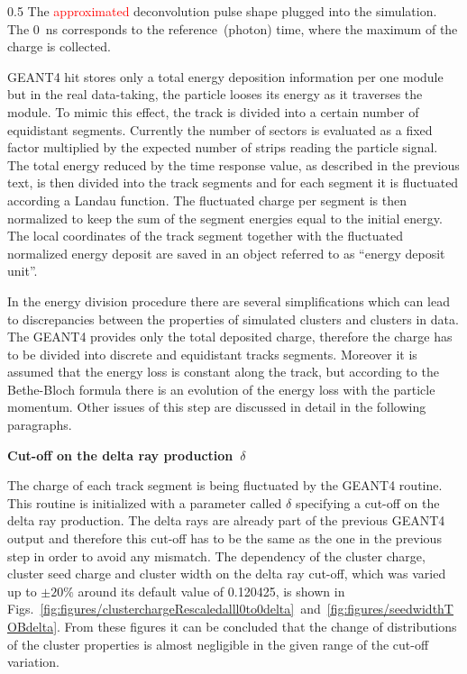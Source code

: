                  {0.5}       %
                 { The \textcolor{red}{approximated} deconvolution pulse shape plugged into the simulation. The 0~ns corresponds to the reference~(photon) time, where the maximum of the charge is collected.}

GEANT4 hit stores only a total energy deposition information per one module but in the real data-taking, the particle looses its energy as it traverses the module. To mimic this effect, the track is divided into a certain number of equidistant segments. Currently the number of sectors is evaluated as a fixed factor multiplied by the expected number of strips reading the particle signal. The total energy reduced by the time response value, as described in the previous text, is then divided into the track segments and for each segment it is fluctuated according a Landau function. The fluctuated charge per segment is then normalized to keep the sum of the segment energies equal to the initial energy. The local coordinates of the track segment together with the fluctuated normalized energy deposit are saved in an object referred to as ``energy deposit unit''.

In the energy division procedure there are several simplifications which can lead to discrepancies between the properties of simulated clusters and clusters in data. The GEANT4 provides only the total deposited charge, therefore the charge has to be divided into discrete and equidistant tracks segments. Moreover it is assumed that the energy loss is constant along the track, but according to the Bethe-Bloch formula there is an evolution of the energy loss with the particle momentum. Other issues of this step are discussed in detail in the following paragraphs.

\textbf{Cut-off on the delta ray production~$\delta$ }

The charge of each track segment is being fluctuated by the GEANT4 routine. This routine is initialized with a parameter called $\delta$ specifying a cut-off on the delta ray production. The delta rays are already part of the previous GEANT4 output and therefore this cut-off has to be the same as the one in the previous step in order to avoid any mismatch. The dependency of the cluster charge, cluster seed charge and cluster width on the delta ray cut-off, which was varied up to $\pm 20\%$ around its default value of 0.120425, is shown in Figs.~\ref{fig:figures/clusterchargeRescaledalll0to0delta}~and~\ref{fig:figures/seedwidthTOBdelta}. From these figures it can be concluded that the change of distributions of the cluster properties is almost negligible in the given range of the cut-off variation. 

